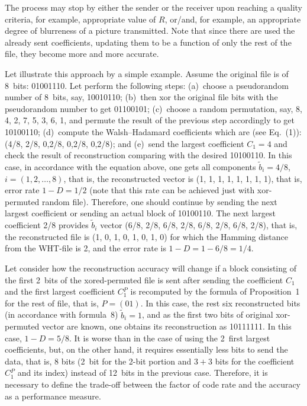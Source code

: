 \begin{multicols}{2}
The process may stop by either the sender or the receiver upon reaching a quality 
criteria, for example, appropriate value of  $R$, or/and, for example, an appropriate 
degree of blurreness of a picture transmitted.
Note that since there are  used the already sent coefficients, updating them to be a  function of 
only the rest of the file, they become more and more accurate.

Let illustrate this approach by a simple example.
Assume the original file is of 8~bits: 01001110.  Let perform the following steps: 
(a)~choose a pseudorandom number of 8~bits, say, 10010110; 
(b)~then xor the original file bits with the pseudorandom number to get 01100101; 
(c)~choose a random permutation, say, 8, 4, 2, 7, 5, 3, 6, 1, and permute the result 
of the previous step accordingly to get 10100110; 
(d)~compute the Walsh--Hadamard coefficients which are (see Eq.~(1)):
(4/8, 2/8, 0,2/8, 0,2/8, 0,2/8);  and (e)~send the largest coefficient $C_1=4$ and 
check the result of reconstruction comparing with the desired 10100110.  In this case, 
in accordance with the equation above, one gets all components $\tilde b_i =4/8$, 
$i= (1,2,\ldots,8)$,  that is, the reconstructed vector is (1, 1, 1, 1, 1, 1, 1, 1), 
that is, error rate $1-D=1/2$ (note that this rate can be achieved just with 
xor-permuted  random file). Therefore, one should continue by sending the next 
largest coefficient or sending an actual block of 10100110.  The next largest 
coefficient 2/8 provides $ \tilde b_i$  vector (6/8, 2/8, 6/8, 2/8, 6/8, 2/8, 6/8, 2/8),  
that is, the reconstructed file is (1, 0, 1, 0, 1, 0, 1, 0) for which the Hamming distance 
from the WHT-file is 2, and the error rate is $1-D=1-6/8=1/4$.

Let consider how the reconstruction accuracy will change if a 
block consisting of the first 2~bits of the xored-permuted file is sent after sending 
the coefficient  $C_1$  and the first largest coefficient $C{^P_1}$ is recomputed
by the formula  of {Proposition~1} for the rest of file, that is, $P=(01)$. 
In this case, the rest six reconstructed bits (in accordance  with formula~8)  
$\tilde b_i =1$, and as  the first two bits of original xor-permuted vector are known, 
one obtains its reconstruction as 10111111. In this case, $1-D=5/8$. It is worse than 
in the case of using the 2~first largest coefficients, but, on the other hand, it 
requires essentially less bits to send the data, that is, 8 bits (2~bit for the 
2-bit portion and $3+3$ bits for the coefficient  $C{^P_1}$  and its index) instead of 
12~bits in the previous case. Therefore, it is necessary to 
define the trade-off between the factor 
of code rate and the accuracy as a performance measure.


\end{multicols}
